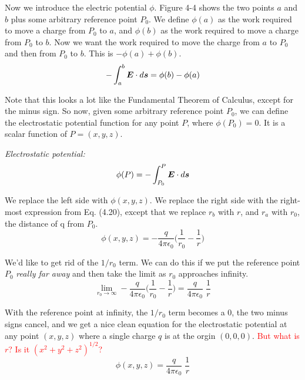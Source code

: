 Now we introduce the electric potential $\phi$.
Figure 4-4 shows the two points $a$ and $b$ plus some arbitrary reference point $P_0$.
We define $\phi(a)$ as the work required to move a charge from $P_0$ to $a$,
and $\phi(b)$ as the work required to move a charge from $P_0$ to $b$.
Now we want the work required to move the charge from $a$ to $P_0$ 
and then from $P_0$ to $b$. This is $-\phi(a)+\phi(b)$.
\begin{equation}
  - \int_a^b \boldsymbol{E} \cdot d\boldsymbol{s} = \phi(b) - \phi(a)
\end{equation}

Note that this looks a lot like the Fundamental Theorem of Calculus, 
except for the minus sign.  So now, given some arbitrary reference point $P_0$, 
we can define the electrostatic potential function for any point $P$, where $\phi(P_0)=0$.
It is a scalar function of $P=(x,y,z)$.

\hspace{2em}\emph{Electrostatic potential:}
\begin{equation}
  \phi(P) = - \int_{P_0}^P \boldsymbol{E} \cdot d\boldsymbol{s}
\end{equation}

We replace the left side with $\phi(x,y,z)$.
We replace the right side with the right-most expression from Eq. (4.20),
except that we replace $r_b$ with $r$, and
$r_a$ with $r_0$, the distance of q from $P_0$.
\begin{equation*}
  \phi(x,y,z) = - \frac{q}{4\pi\epsilon_0} \bigg(\frac{1}{r_0}-\frac{1}{r}\bigg)
\end{equation*}

We'd like to get rid of the $1/r_0$ term.  We can do this if
we put the reference point $P_0$ \emph{really far away} and then take the limit
as $r_0$ approaches infinity.
\begin{equation*}
  \lim_{r_0 \to \infty} -\frac{q}{4\pi\epsilon_0} \bigg(\frac{1}{r_0}-\frac{1}{r}\bigg)
  = \frac{q}{4\pi\epsilon_0} \; \frac{1}{r}
\end{equation*}

With the reference point at infinity, 
the $1/r_0$ term becomes a 0, the two minus signs cancel,
and we get a nice clean equation for the electrostatic potential
at any point $(x,y,z)$ where a single charge $q$ is at the orgin $(0,0,0)$.
\textcolor{red}{But what is $r$? Is it $(x^2 + y^2 + z^2)^{1/2}$?}
\begin{equation}
  \phi(x,y,z) = \frac{q}{4\pi\epsilon_0} \; \frac{1}{r}
\end{equation}

